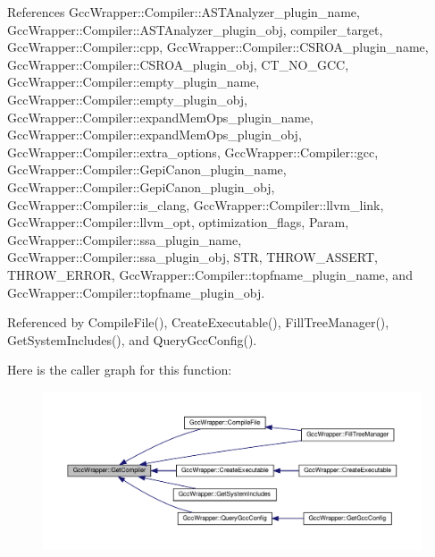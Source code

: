 References Gcc\+Wrapper\+::\+Compiler\+::\+A\+S\+T\+Analyzer\+\_\+plugin\+\_\+name, Gcc\+Wrapper\+::\+Compiler\+::\+A\+S\+T\+Analyzer\+\_\+plugin\+\_\+obj, compiler\+\_\+target, Gcc\+Wrapper\+::\+Compiler\+::cpp, Gcc\+Wrapper\+::\+Compiler\+::\+C\+S\+R\+O\+A\+\_\+plugin\+\_\+name, Gcc\+Wrapper\+::\+Compiler\+::\+C\+S\+R\+O\+A\+\_\+plugin\+\_\+obj, C\+T\+\_\+\+N\+O\+\_\+\+G\+CC, Gcc\+Wrapper\+::\+Compiler\+::empty\+\_\+plugin\+\_\+name, Gcc\+Wrapper\+::\+Compiler\+::empty\+\_\+plugin\+\_\+obj, Gcc\+Wrapper\+::\+Compiler\+::expand\+Mem\+Ops\+\_\+plugin\+\_\+name, Gcc\+Wrapper\+::\+Compiler\+::expand\+Mem\+Ops\+\_\+plugin\+\_\+obj, Gcc\+Wrapper\+::\+Compiler\+::extra\+\_\+options, Gcc\+Wrapper\+::\+Compiler\+::gcc, Gcc\+Wrapper\+::\+Compiler\+::\+Gepi\+Canon\+\_\+plugin\+\_\+name, Gcc\+Wrapper\+::\+Compiler\+::\+Gepi\+Canon\+\_\+plugin\+\_\+obj, Gcc\+Wrapper\+::\+Compiler\+::is\+\_\+clang, Gcc\+Wrapper\+::\+Compiler\+::llvm\+\_\+link, Gcc\+Wrapper\+::\+Compiler\+::llvm\+\_\+opt, optimization\+\_\+flags, Param, Gcc\+Wrapper\+::\+Compiler\+::ssa\+\_\+plugin\+\_\+name, Gcc\+Wrapper\+::\+Compiler\+::ssa\+\_\+plugin\+\_\+obj, S\+TR, T\+H\+R\+O\+W\+\_\+\+A\+S\+S\+E\+RT, T\+H\+R\+O\+W\+\_\+\+E\+R\+R\+OR, Gcc\+Wrapper\+::\+Compiler\+::topfname\+\_\+plugin\+\_\+name, and Gcc\+Wrapper\+::\+Compiler\+::topfname\+\_\+plugin\+\_\+obj.



Referenced by Compile\+File(), Create\+Executable(), Fill\+Tree\+Manager(), Get\+System\+Includes(), and Query\+Gcc\+Config().

Here is the caller graph for this function\+:
\nopagebreak
\begin{figure}[H]
\begin{center}
\leavevmode
\includegraphics[width=350pt]{d4/dbf/classGccWrapper_a2de0745c83e81e349b84a99b68b2519e_icgraph}
\end{center}
\end{figure}
\mbox{\label{classGccWrapper_ab7fc5dafe65775ce866c205c60fd8413}} 
